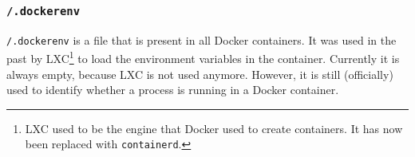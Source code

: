 \subsubsection{\texorpdfstring{\lstinline{/.dockerenv}}{/.dockerenv}}\label{subsubsection:dockerenv}
\lstinline{/.dockerenv} is a file that is present in all Docker containers. It was used in the past by LXC\footnote{LXC used to be the engine that Docker used to create containers. It has now been replaced with \lstinline{containerd}.} to load the environment variables in the container. Currently it is always empty, because LXC is not used anymore. However, it is still (officially) used to identify whether a process is running in a Docker container\cite{Metasploit-Linux-Gather-Container-Detection}\cite{Removed-Dockerinit-Reference}.
